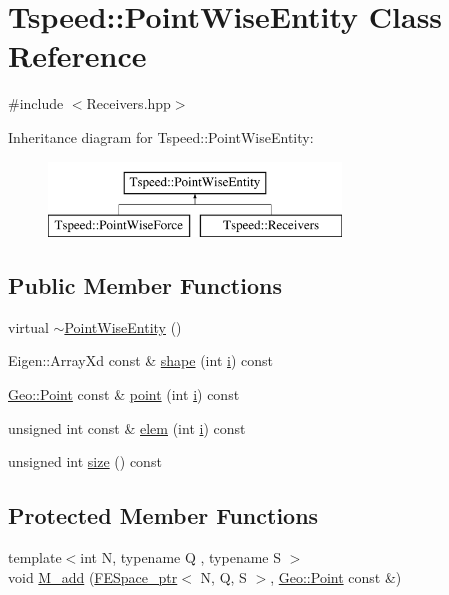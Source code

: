 \hypertarget{classTspeed_1_1PointWiseEntity}{\section{Tspeed\-:\-:Point\-Wise\-Entity Class Reference}
\label{classTspeed_1_1PointWiseEntity}
}


{\ttfamily \#include $<$Receivers.\-hpp$>$}

Inheritance diagram for Tspeed\-:\-:Point\-Wise\-Entity\-:\begin{figure}[H]
\begin{center}
\leavevmode
\includegraphics[height=2.000000cm]{classTspeed_1_1PointWiseEntity}
\end{center}
\end{figure}
\subsection*{Public Member Functions}
\begin{DoxyCompactItemize}
\item 
virtual \hyperlink{classTspeed_1_1PointWiseEntity_a602393b4fd96ffd3d40ea3ff30cdc366}{$\sim$\-Point\-Wise\-Entity} ()
\item 
Eigen\-::\-Array\-Xd const \& \hyperlink{classTspeed_1_1PointWiseEntity_a9369e650140e66a58e902ee752cf36ca}{shape} (int \hyperlink{vtk__vector__out_8m_a6f6ccfcf58b31cb6412107d9d5281426}{i}) const 
\item 
\hyperlink{classTspeed_1_1Geo_1_1Point}{Geo\-::\-Point} const \& \hyperlink{classTspeed_1_1PointWiseEntity_a4a71d4b7bfa160b2aaa6d3d2a4c35713}{point} (int \hyperlink{vtk__vector__out_8m_a6f6ccfcf58b31cb6412107d9d5281426}{i}) const 
\item 
unsigned int const \& \hyperlink{classTspeed_1_1PointWiseEntity_ac1271c51d7dd8689a38a60ca858e160f}{elem} (int \hyperlink{vtk__vector__out_8m_a6f6ccfcf58b31cb6412107d9d5281426}{i}) const 
\item 
unsigned int \hyperlink{classTspeed_1_1PointWiseEntity_aea02312bcb1b3c20a465e2d696b65924}{size} () const 
\end{DoxyCompactItemize}
\subsection*{Protected Member Functions}
\begin{DoxyCompactItemize}
\item 
{\footnotesize template$<$int N, typename Q , typename S $>$ }\\void \hyperlink{classTspeed_1_1PointWiseEntity_a8e8e5d0b5785b72de3b9f7ef1cbfcd81}{M\-\_\-add} (\hyperlink{namespaceTspeed_a05fcb57094666c8f5ab1e90d1a6fecf8}{F\-E\-Space\-\_\-ptr}$<$ N, Q, S $>$, \hyperlink{classTspeed_1_1Geo_1_1Point}{Geo\-::\-Point} const \&)
\end{DoxyCompactItemize}
